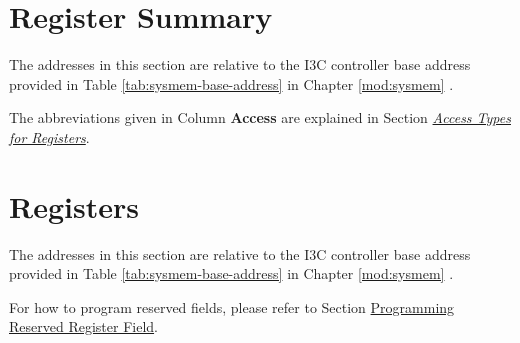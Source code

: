 \documentclass[main\_\_EN.tex]{subfiles}
\begin{document}

\newpage
\hypertarget{i3c-reg-summ}{}
\section{Register Summary}
\label{sec:i3c-reg-summ}


The addresses in this section are relative to the I3C controller base address provided in Table \ref{tab:sysmem-base-address} in Chapter \ref{mod:sysmem} \textit{}.

The abbreviations given in Column \textbf{Access} are explained in Section \hyperref[glossary-access-types]{\textit{Access Types for Registers}}.





\newpage
\section{Registers}

The addresses in this section are relative to the I3C controller base address provided in Table \ref{tab:sysmem-base-address} in Chapter \ref{mod:sysmem} \textit{}.

For how to program reserved fields, please refer to Section \hyperref[programming-reserved-field]{Programming Reserved Register Field}.




\end{document}
